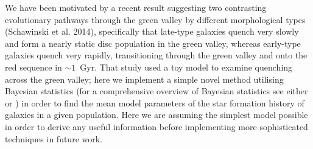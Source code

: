 \documentclass{mn2e}
\begin{document}
We have been motivated by a recent result suggesting two contrasting evolutionary pathways through the green valley by different morphological types (Schawinski et al. 2014), specifically that late-type galaxies quench very slowly and form a nearly static disc population in the green valley, whereas early-type galaxies quench very rapidly, transitioning through the green valley and onto the red sequence in $\sim 1$~Gyr. That study used a toy model to examine quenching across the green valley; here we implement a simple novel method utilising Bayesian statistics (for a comprehensive overview of Bayesian statistics see either \citealt{MacKay} or \citealt{Sivia}) in order to find the mean model parameters of the star formation history of galaxies in a given population. Here we are assuming the simplest model possible in order to derive any useful information before implementing more sophisticated techniques in future work. 

\end{document}
